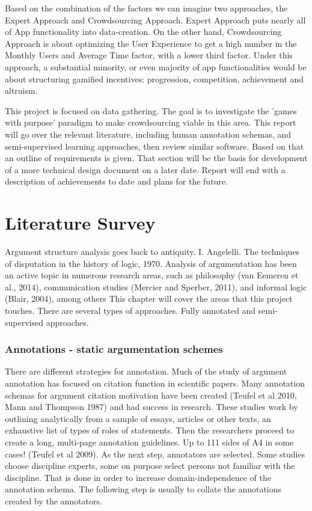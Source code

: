 \documentclass{article}
\begin{document}
Based on the combination of the factors we can imagine two approaches, the Expert Approach and Crowdsourcing Approach.  Expert Approach puts nearly all of App functionality into data-creation. 
On the other hand, Crowdsourcing Approach is about optimizing the User Experience to get a high number in the Monthly Users and Average Time factor, with a lower third factor.  Under this approach, a substantial minority, or even majority of app functionalities would be about structuring gamified incentives: progression, competition, achievement and altruism.

This project is focused on data gathering. The goal is to investigate the 'games with purpose' paradigm to make crowdsourcing viable in this area.
This report will go over the relevant literature, including human annotation schemas, and semi-supervised learning approaches, then review similar software. Based on that an outline of requirements is given. 
That section will be the basis for development of a more technical design document on a later date.
Report will end with a description of achievements to date and plans for the future.

\newpage

\chapter{Literature Survey}
Argument structure analysis goes back to antiquity. I. Angelelli. The techniques of disputation in the history of logic, 1970.
Analysis of argumentation has been an active topic in numerous research areas, such as philosophy (van Eemeren et al., 2014), communication studies (Mercier and Sperber, 2011), and informal logic (Blair, 2004), among others This chapter will cover the areas that this project touches. There are several types of approaches. Fully annotated and semi-supervised approaches.

\subsection{Annotations - static argumentation schemes}
There are different strategies for annotation. Much of the study of argument annotation has focused on citation function in scientific papers.
Many annotation schemas for argument citation motivation have been created (Teufel et al 2010, Mann and Thompson 1987) and had success in research.
These studies work by outlining analytically from a sample of essays, articles or other texts, an exhaustive list of types of roles of statements.
Then the researchers proceed to create a long, multi-page annotation guidelines. Up to 111 sides of A4 in some cases! (Teufel et al 2009).
As the next step, annotators are selected. Some studies choose discipline experts, some on purpose select persons not familiar with the discipline.
That is done in order to increase domain-independence of the annotation schema.
The following step is usually to collate the annotations created by the annotators. 
\end{document}
